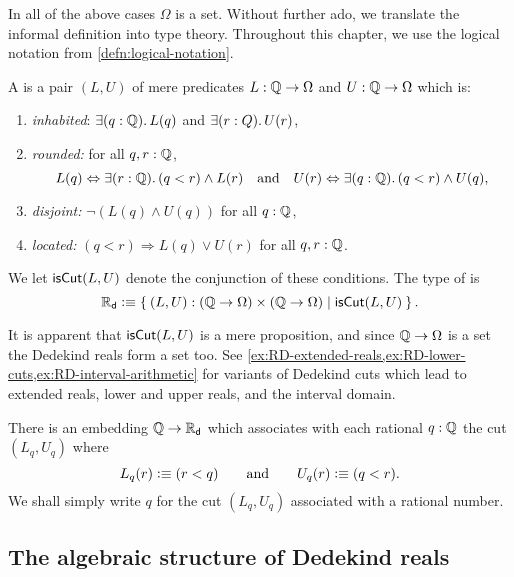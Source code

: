 In all of the above cases $\Omega$ is a set.
%
Without further ado, we translate the informal definition into type theory.
Throughout this chapter, we use the
logical notation from \autoref{defn:logical-notation}.

\begin{defn} \label{defn:dedekind-reals}
  A  is a pair $(L, U)$ of mere predicates $L : \mathbb{Q} \to \Omega$ and $U
  : \mathbb{Q} \to \Omega$ which is:
  \begin{enumerate}
  \item \emph{inhabited}: $\exis{q : \Q} L(q)$ and $\exis{r : Q} U(r)$,
  \item \emph{rounded:} for all $q, r : \mathbb{Q}$,
    \begin{equation*}
      L(q) \Leftrightarrow \exis{r : \Q} (q < r) \land L(r)
      \quad\text{and}\quad
      U(r) \Leftrightarrow \exis{q : \Q} (q < r) \land U(q),
    \end{equation*}
  \item \emph{disjoint:} $\lnot (L(q) \land U(q))$ for all $q : \mathbb{Q}$,
  \item \emph{located:} $(q < r) \Rightarrow L(q) \lor U(r)$ for all $q, r : \mathbb{Q}$.
  \end{enumerate}
  We let $\mathsf{isCut}(L, U)$ denote the conjunction of these conditions. The type of
   is
  \begin{equation*}
    \RD \defeq \setof{ (L, U) : (\Q \to \Omega) \times (\Q \to \Omega) | \dcut(L,U)}.
  \end{equation*}
\end{defn}

It is apparent that $\mathsf{isCut}(L, U)$ is a mere proposition, and since $\mathbb{Q} \to \Omega$ is a
set the Dedekind reals form a set too. See
\autoref{ex:RD-extended-reals,ex:RD-lower-cuts,ex:RD-interval-arithmetic} for variants of
Dedekind cuts which lead to extended reals, lower and upper reals, and the interval
domain.

There is an embedding $\mathbb{Q} \to \mathbb{R}_\mathsf{d}$ which associates with each rational $q : \mathbb{Q}$ the cut
$(L_q, U_q)$ where
%
\begin{equation*}
  L_q(r) \vcentcolon\equiv (r < q)
  \qquad\text{and}\qquad
  U_q(r) \vcentcolon\equiv (q < r).
\end{equation*}
%
We shall simply write $q$ for the cut $(L_q, U_q)$ associated with a rational number.

\subsection{The algebraic structure of Dedekind reals}
\label{sec:algebr-struct-dedek}

